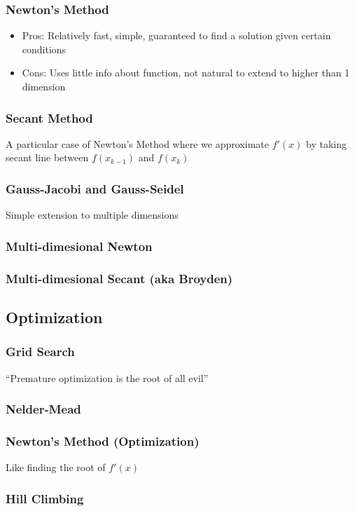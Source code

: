 \documentclass[10pt]{beamer}
\begin{document}
\begin{frame} \frametitle{Newton's Method}
  \begin{itemize}
    \item Pros: Relatively fast, simple, guaranteed to find a solution given certain conditions
    \item Cons: Uses little info about function, not natural to extend to higher than 1 dimension
  \end{itemize}
\end{frame}

\begin{frame} \frametitle{Secant Method}
  A particular case of Newton's Method where we approximate $f'(x)$ by taking secant line between $f(x_{k-1})$ and $f(x_k)$
\end{frame}

\begin{frame} \frametitle{Gauss-Jacobi and Gauss-Seidel}
  Simple extension to multiple dimensions
\end{frame}

\begin{frame} \frametitle{Multi-dimesional Newton}
\end{frame}

\begin{frame} \frametitle{Multi-dimesional Secant (aka Broyden)}
\end{frame}

\subsection{Optimization}

\begin{frame} \frametitle{Grid Search}
  ``Premature optimization is the root of all evil''
\end{frame}

\begin{frame} \frametitle{Nelder-Mead}

\end{frame}

\begin{frame} \frametitle{Newton's Method (Optimization)}

  Like finding the root of $f'(x)$

\end{frame}

\begin{frame} \frametitle{Hill Climbing}

\end{frame}
\end{document}

